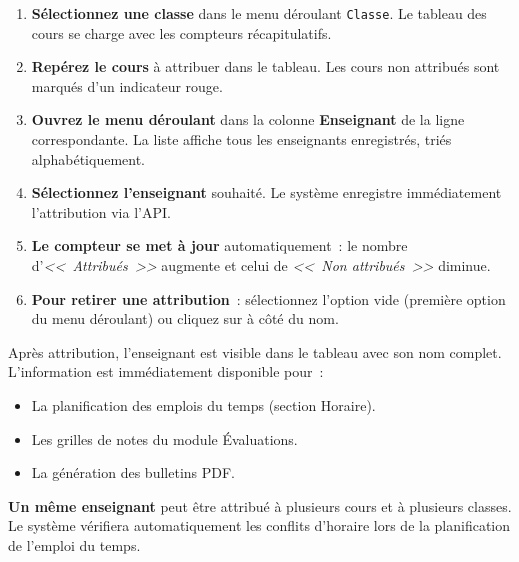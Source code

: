 \documentclass[12pt,a4paper]{report}
\newcommand{\champ}[1]{\texttt{\color{violet}#1}}
\begin{document}
\begin{etape}[title=Proc\'edure d\'etaill\'ee : Attribuer un enseignant]
\begin{enumerate}[leftmargin=1.5cm,label=\textbf{\arabic*.},itemsep=12pt]
  \item \textbf{S\'electionnez une classe} dans le menu d\'eroulant \champ{Classe}. Le tableau des cours se charge avec les compteurs r\'ecapitulatifs.

  \item \textbf{Rep\'erez le cours} \`a attribuer dans le tableau. Les cours non attribu\'es sont marqu\'es d'un indicateur rouge.

  \item \textbf{Ouvrez le menu d\'eroulant} dans la colonne \textbf{Enseignant} de la ligne correspondante. La liste affiche tous les enseignants enregistr\'es, tri\'es alphab\'etiquement.

  \item \textbf{S\'electionnez l'enseignant} souhait\'e. Le syst\`eme enregistre imm\'ediatement l'attribution via l'API.

  \item \textbf{Le compteur se met \`a jour} automatiquement~: le nombre d'\textit{<<~Attribu\'es~>>} augmente et celui de \textit{<<~Non attribu\'es~>>} diminue.

  \item \textbf{Pour retirer une attribution}~: s\'electionnez l'option vide (premi\`ere option du menu d\'eroulant) ou cliquez sur \textcolor{rose}{\faTimes} \`a c\^ot\'e du nom.
\end{enumerate}
\end{etape}

\begin{resultat}
Apr\`es attribution, l'enseignant est visible dans le tableau avec son nom complet. L'information est imm\'ediatement disponible pour~:
\begin{itemize}
  \item La planification des emplois du temps (section Horaire).
  \item Les grilles de notes du module \'Evaluations.
  \item La g\'en\'eration des bulletins PDF.
\end{itemize}
\end{resultat}

\begin{astuce}
\textbf{Un m\^eme enseignant} peut \^etre attribu\'e \`a plusieurs cours et \`a plusieurs classes. Le syst\`eme v\'erifiera automatiquement les conflits d'horaire lors de la planification de l'emploi du temps.
\end{astuce}
\end{document}
